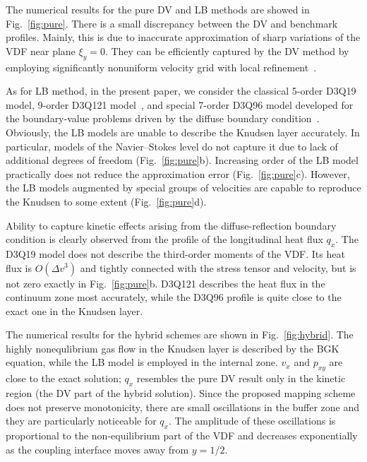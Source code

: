 \documentclass{aip-cp}
\newcommand{\OO}[1]{O(#1)}
\begin{document}
The numerical results for the pure DV and LB methods are showed in Fig.~\ref{fig:pure}.
There is a small discrepancy between the DV and benchmark profiles.
Mainly, this is due to inaccurate approximation of sharp variations of the VDF near plane \(\xi_y=0\).
They can be efficiently captured by the DV method by employing significantly nonuniform velocity grid
with local refinement~\cite{Ohwada1990, Rogozin2016}.

As for LB method, in the present paper, we consider the classical 5-order D3Q19 model, 9-order D3Q121 model~\cite{Shan2010},
and special 7-order D3Q96 model developed for the boundary-value problems driven by the diffuse boundary condition~\cite{Feuchter2016}.
Obviously, the LB models are unable to describe the Knudsen layer accurately.
In particular, models of the Navier--Stokes level do not capture it due to lack of additional degrees of freedom (Fig.~\ref{fig:pure}b).
Increasing order of the LB model practically does not reduce the approximation error (Fig.~\ref{fig:pure}c).
However, the LB models augmented by special groups of velocities are capable to reproduce the Knudsen to some extent (Fig.~\ref{fig:pure}d).

Ability to capture kinetic effects arising from the diffuse-reflection boundary condition
is clearly observed from the profile of the longitudinal heat flux \(q_x\).
The D3Q19 model does not describe the third-order moments of the VDF.
Its heat flux is \(\OO{\Delta v^3}\) and tightly connected with the stress tensor and velocity, but is not zero exactly in Fig.~\ref{fig:pure}b.
D3Q121 describes the heat flux in the continuum zone most accurately, while the D3Q96 profile is quite close to the exact one in the Knudsen layer.

The numerical results for the hybrid schemes are shown in Fig.~\ref{fig:hybrid}.
The highly nonequlibrium gas flow in the Knudsen layer is described by the BGK equation,
while the LB model is employed in the internal zone.
\(v_x\) and \(p_{xy}\) are close to the exact solution;
\(q_x\) resembles the pure DV result only in the kinetic region (the DV part of the hybrid solution).
Since the proposed mapping scheme does not preserve monotonicity,
there are small oscillations in the buffer zone and they are particularly noticeable for \(q_x\).
The amplitude of these oscillations is proportional to the non-equilibrium part of the VDF
and decreases exponentially as the coupling interface moves away from \(y=1/2\).
\end{document}
